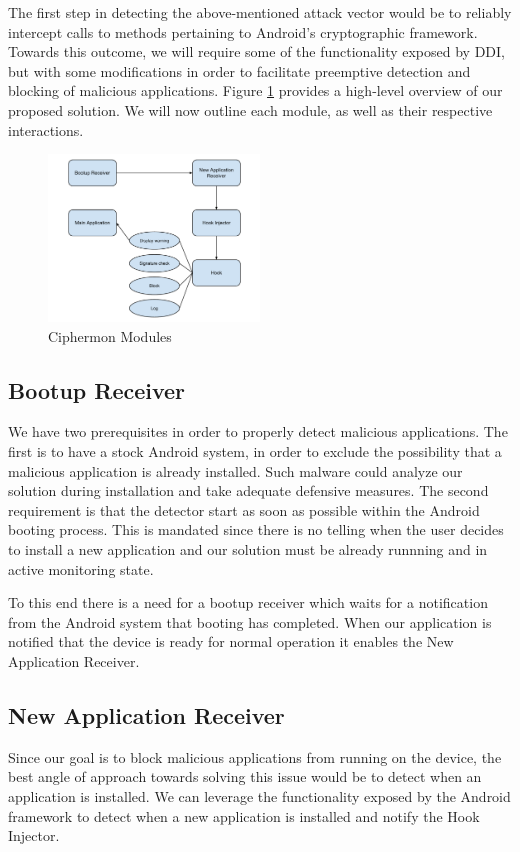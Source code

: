 The first step in detecting the above-mentioned attack vector would be to
reliably intercept calls to methods pertaining to Android's cryptographic
framework. Towards this outcome, we will require some of the functionality
exposed by DDI, but with some modifications in order to facilitate preemptive
detection and blocking of malicious applications. Figure \ref{fig:ciphermon}
provides a high-level overview of our proposed solution. We will now outline
each module, as well as their respective interactions.

\begin{figure}[hb]
  \centering
  \includegraphics[width=0.5\textwidth]{img/ciphermon}
  \caption{Ciphermon Modules}
  \label{fig:ciphermon}
\end{figure}

\subsection{Bootup Receiver}
We have two prerequisites in order to properly detect malicious applications.
The first is to have a stock Android system, in order to exclude the
possibility that a malicious application is already installed. Such malware
could analyze our solution during installation and take adequate defensive
measures. The second requirement is that the detector start as soon as
possible within the Android booting process. This is mandated since there is
no telling when the user decides to install a new application and our solution
must be already runnning and in active monitoring state.

To this end there is a need for a bootup receiver which waits for a
notification from the Android system that booting has completed. When our
application is notified that the device is ready for normal operation it
enables the New Application Receiver.

\subsection{New Application Receiver}
Since our goal is to block malicious applications from running on the
device, the best angle of approach towards solving this issue would be to
detect when an application is installed. We can leverage the functionality
exposed by the Android framework to detect when a new application is installed
and notify the Hook Injector.

